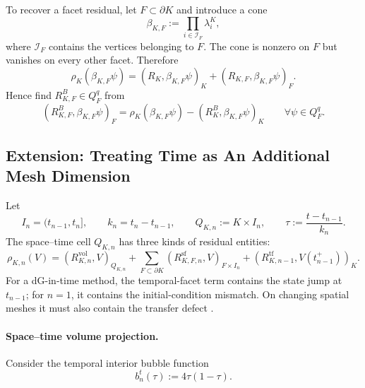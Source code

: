 \documentclass[11pt,a4paper]{article}
\begin{document}
To recover a facet residual, let \(F\subset\partial K\) and introduce a cone
\begin{equation}
 \beta_{K,F}:=\prod_{i\in\mathcal I_F}\lambda_i^K,
 \label{eq:recovery-facet-cone}
\end{equation}
where \(\mathcal I_F\) contains the vertices belonging to \(F\). The cone is nonzero on \(F\) but vanishes on every other facet. Therefore
\begin{equation}
 \rho_K(\beta_{K,F}\psi)
 =
 (R_K,\beta_{K,F}\psi)_K
 +
 (R_{K,F},\beta_{K,F}\psi)_F.
 \label{eq:facet-probe-expanded}
\end{equation}
Hence find
\(R_{K,F}^B\in Q_F^q\) from
\begin{equation}
 \boxed{
 (R_{K,F}^B,\beta_{K,F}\psi)_F
 =
 \rho_K(\beta_{K,F}\psi)
 -
 (R_K^B,\beta_{K,F}\psi)_K
 \qquad\forall\psi\in Q_F^q.}
 \label{eq:stationary-facet-projection}
\end{equation}


\subsection{Extension: Treating Time as An Additional Mesh Dimension}
\label{sec:space-time-residual-recovery}

Let
\[
 I_n=(t_{n-1},t_n],
 \qquad
 k_n=t_n-t_{n-1},
 \qquad
 Q_{K,n}:=K\times I_n,
 \qquad
 \tau:=\frac{t-t_{n-1}}{k_n}.
\]
The space--time cell \(Q_{K,n}\) has three kinds of residual entities:
\begin{equation}
 \rho_{K,n}(V)
 =
 (R_{K,n}^{\mathrm{vol}},V)_{Q_{K,n}}
 +
 \sum_{F\subset\partial K}
 (R_{K,F,n}^{\mathrm{sf}},V)_{F\times I_n}
 +
 (R_{K,n-1}^{\mathrm{tf}},V(t_{n-1}^{+}))_K .
 \label{eq:space-time-residual-representation}
\end{equation}
For a dG-in-time method, the temporal-facet term contains the state jump at \(t_{n-1}\); for \(n=1\), it contains the initial-condition mismatch. On changing spatial meshes it must also contain the transfer defect \cite{ErikssonJohnsonThomee1985,SchmichVexler2008}.

\paragraph{Space--time volume projection.}
Consider the temporal interior bubble function
\begin{equation}
 b_n^t(\tau):=4\tau(1-\tau).
 \label{eq:temporal-interior-bubble}
\end{equation}
\end{document}
